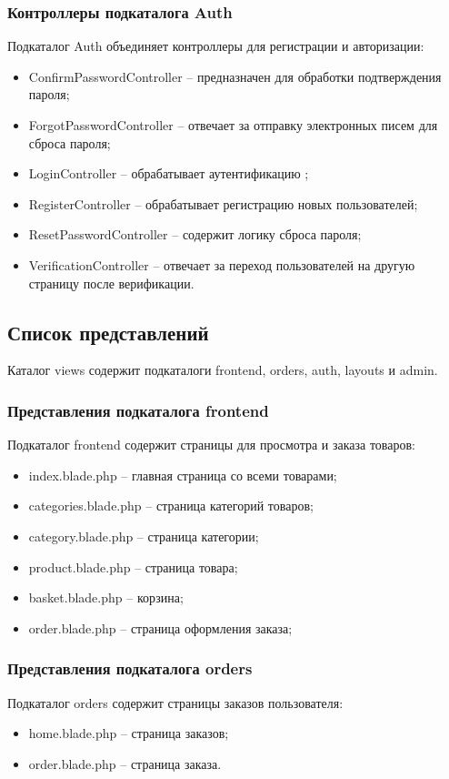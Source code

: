 \subsubsection{Контроллеры подкаталога Auth}
Подкаталог Auth объединяет контроллеры для регистрации и авторизации: 
\begin{itemize}
	\item ConfirmPasswordController – предназначен для обработки подтверждения пароля;
	\item ForgotPasswordController – отвечает за отправку электронных писем для сброса пароля;
	\item LoginController – обрабатывает аутентификацию ;
	\item RegisterController – обрабатывает регистрацию новых пользователей;
	\item ResetPasswordController – содержит логику сброса пароля;
	\item VerificationController – отвечает за переход пользователей на другую страницу после верификации.
\end{itemize}

\subsection{Список представлений}

Каталог views содержит подкаталоги frontend, orders, auth, layouts и admin.

\subsubsection{Представления подкаталога frontend}
Подкаталог frontend содержит страницы для просмотра и заказа товаров:
\begin{itemize}
	\item index.blade.php – главная страница со всеми товарами;
	\item categories.blade.php – страница категорий товаров;
	\item category.blade.php – страница категории;
	\item product.blade.php – страница товара;
	\item basket.blade.php – корзина;
	\item order.blade.php – страница оформления заказа;
\end{itemize}

\subsubsection{Представления подкаталога orders}
Подкаталог orders содержит страницы заказов пользователя:
\begin{itemize}
	\item home.blade.php – страница заказов;
	\item order.blade.php – страница заказа.
\end{itemize}

